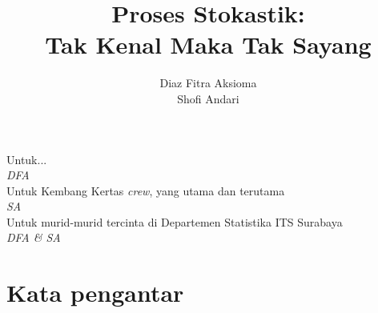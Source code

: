 \documentclass[11pt,b5paper,twoside]{book}
\begin{document}
\title{\LARGE{\textbf{Proses Stokastik:\\Tak Kenal Maka Tak Sayang}}}
\author{Diaz Fitra Aksioma \\ Shofi Andari}
\date{}





\frontmatter
\maketitle


\thispagestyle{empty}

\vspace*{\fill}
\begingroup
\begin{center}
	Untuk... \\ \textit{DFA} \\ 
	\vspace{2cm}
	Untuk Kembang Kertas \textit{crew}, yang utama dan terutama \\ \textit{SA}\\
	\vspace{2cm}
	Untuk murid-murid tercinta di Departemen Statistika ITS Surabaya \\ \textit{DFA \& SA}
\end{center}
\endgroup
\vspace*{\fill}
\newpage

\chapter*{Kata pengantar}
\end{document}
